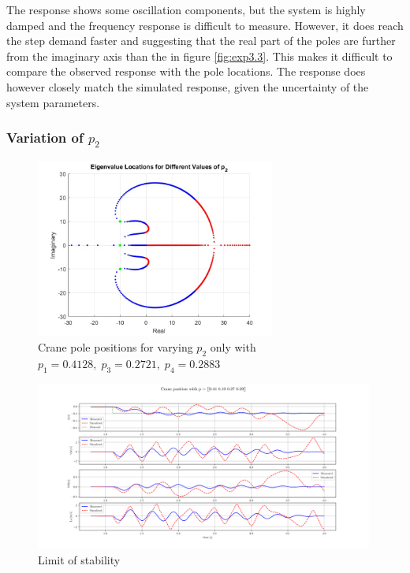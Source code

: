 \documentclass{article}
\begin{document}
The response shows some oscillation components, but the system is highly damped and the frequency response is difficult to measure.
However, it does reach the step demand faster and suggesting that the real part of the poles are further from the imaginary axis than the in figure \ref{fig:exp3.3}. 
This makes it difficult to compare the observed response with the pole locations.
The response does however closely match the simulated response, given the uncertainty of the system parameters.

\subsubsection{Variation of $p_2$}

\begin{figure}[H]
  \centering
  \includegraphics[width=0.7\textwidth]{figures/3.5roots.jpg}
  \caption{Crane pole positions for varying $p_2$ only with $p_1 = 0.4128,\;p_3 = 0.2721,\;p_4 = 0.2883$}
  \label{fig:roots3.5}
\end{figure}

\begin{figure}[H]
  \centering
  \includegraphics[width=0.99\textwidth]{figures/3.5.png}
  \caption{Limit of stability}
  \label{fig:exp3.5}
\end{figure}
\end{document}
